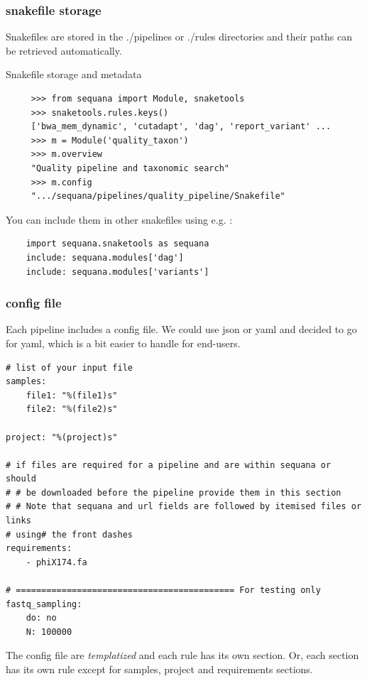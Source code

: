 \documentclass{beamer}
\begin{document}
\begin{frame}[fragile]
    \frametitle{snakefile storage}
    Snakefiles are stored in the ./pipelines or ./rules directories and their paths
    can be retrieved automatically.
    \tiny
    \begin{block}{Snakefile storage and metadata}
    \begin{lstlisting}
     >>> from sequana import Module, snaketools 
     >>> snaketools.rules.keys()
     ['bwa_mem_dynamic', 'cutadapt', 'dag', 'report_variant' ...
     >>> m = Module('quality_taxon')
     >>> m.overview
     "Quality pipeline and taxonomic search"
     >>> m.config
     ".../sequana/pipelines/quality_pipeline/Snakefile"
    \end{lstlisting}

    You can include them in other snakefiles using e.g. :
    \begin{lstlisting}
    import sequana.snaketools as sequana
    include: sequana.modules['dag']
    include: sequana.modules['variants']
    \end{lstlisting}

    \end{block}
\end{frame}


\begin{frame}[fragile]
 \frametitle{config file}
 Each pipeline includes a config file. We could use json or yaml and decided 
 to go for yaml, which is a bit easier to handle for end-users.
 
\begin{block}{}
 \begin{lstlisting} 
# list of your input file
samples:
    file1: "%(file1)s"
    file2: "%(file2)s"

project: "%(project)s"

# if files are required for a pipeline and are within sequana or should
# # be downloaded before the pipeline provide them in this section
# # Note that sequana and url fields are followed by itemised files or links
# using# the front dashes
requirements:
    - phiX174.fa

# =========================================== For testing only
fastq_sampling:
    do: no
    N: 100000
\end{lstlisting}
\end{block}
 
 \small

The config file are \textit{templatized} and each rule has its own section.
Or, each section has its own rule except for samples, project and requirements 
sections.
\end{frame}
\end{document}
